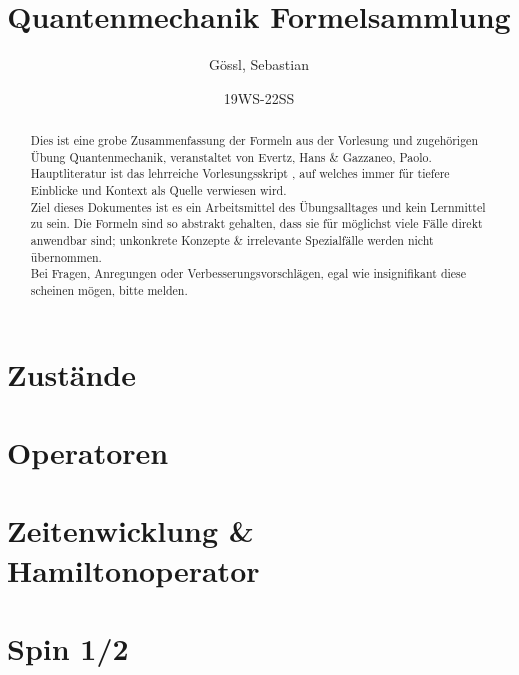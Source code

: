 \documentclass[12pt,a4paper]{report}
\title{Quantenmechanik Formelsammlung}
\author{Gössl, Sebastian}
\date{19WS-22SS}
\begin{document}
\maketitle



\begin{abstract}
    Dies ist eine grobe Zusammenfassung der Formeln aus der Vorlesung und zugehörigen Übung Quantenmechanik, veranstaltet von Evertz, Hans \& Gazzaneo, Paolo. Hauptliteratur ist das lehrreiche Vorlesungsskript \cite{qm}, auf welches immer für tiefere Einblicke und Kontext als Quelle verwiesen wird. \\
    Ziel dieses Dokumentes ist es ein Arbeitsmittel des Übungsalltages und kein Lernmittel zu sein. Die Formeln sind so abstrakt gehalten, dass sie für möglichst viele Fälle direkt anwendbar sind; unkonkrete Konzepte \& irrelevante Spezialfälle werden nicht übernommen. \\
    Bei Fragen, Anregungen oder Verbesserungsvorschlägen, egal wie insignifikant diese scheinen mögen, bitte melden.
\end{abstract}



\tableofcontents



\nocite{nolting51}
\nocite{nolting52}

\printbibliography[keyword=major,heading=bibintoc]
\printbibliography[keyword=further,heading=subbibliography,title={Weiterführend}]



\chapter{Zustände}



\chapter{Operatoren}



\chapter{Zeitenwicklung \& Hamiltonoperator}



\chapter{Spin 1/2}
\end{document}
